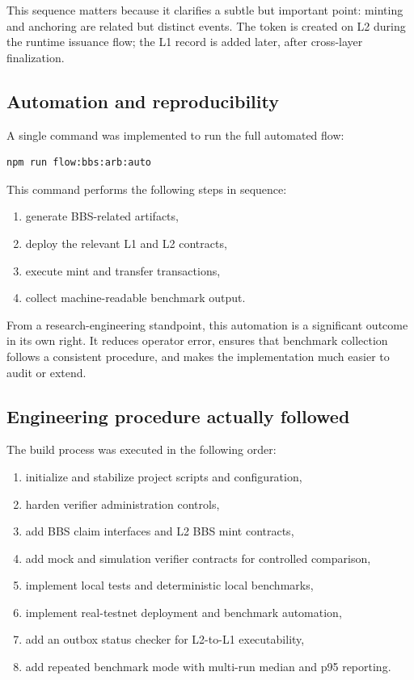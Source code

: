 \documentclass[11pt]{article}
\begin{document}
This sequence matters because it clarifies a subtle but important point: minting and anchoring are related but distinct events. The token is created on L2 during the runtime issuance flow; the L1 record is added later, after cross-layer finalization.

\subsection{Automation and reproducibility}
A single command was implemented to run the full automated flow:

\begin{verbatim}
npm run flow:bbs:arb:auto
\end{verbatim}

This command performs the following steps in sequence:

\begin{enumerate}
  \item generate BBS-related artifacts,
  \item deploy the relevant L1 and L2 contracts,
  \item execute mint and transfer transactions,
  \item collect machine-readable benchmark output.
\end{enumerate}

From a research-engineering standpoint, this automation is a significant outcome in its own right. It reduces operator error, ensures that benchmark collection follows a consistent procedure, and makes the implementation much easier to audit or extend.

\subsection{Engineering procedure actually followed}
The build process was executed in the following order:

\begin{enumerate}
  \item initialize and stabilize project scripts and configuration,
  \item harden verifier administration controls,
  \item add BBS claim interfaces and L2 BBS mint contracts,
  \item add mock and simulation verifier contracts for controlled comparison,
  \item implement local tests and deterministic local benchmarks,
  \item implement real-testnet deployment and benchmark automation,
  \item add an outbox status checker for L2-to-L1 executability,
  \item add repeated benchmark mode with multi-run median and p95 reporting.
\end{enumerate}
\end{document}
